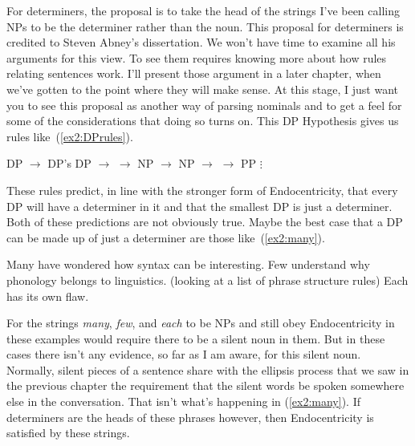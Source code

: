 For determiners, the proposal is to take the head of the strings I've been calling NPs to be the determiner rather than the noun. This proposal for determiners is credited to Steven Abney's dissertation.\cite{Abney:1987} We won't have time to examine all his arguments for this view. To see them requires knowing more about how rules relating sentences work. I'll present those argument in a later chapter, when we've gotten to the point where they will make sense. At this stage, I just want you to see this proposal as another way of parsing nominals and to get a feel for some of the considerations that doing so turns on. This DP Hypothesis gives us rules like~(\ref{ex2:DPrules}).
\enlargethispage*{20pt}
\begin{exe}
	\ex \label{ex2:DPrules}
	\begin{xlist}
		\ex DP $\rightarrow$ DP's 
		\ex DP $\rightarrow$ 
		\ex {} $\rightarrow$  NP
		\ex {} $\rightarrow$ 
		\ex NP $\rightarrow$ 
		\ex {} $\rightarrow$  PP
		\sn \hspace*{20pt}$\vdots$
	\end{xlist}
\end{exe}

These rules predict, in line with the stronger form of Endocentricity, that every DP will have a determiner in it and that the smallest DP is just a determiner. Both of these predictions are not obviously true. Maybe the best case that a DP can be made up of just a determiner are those like~(\ref{ex2:many}).
\enlargethispage*{\baselineskip}
\begin{exe}
	\ex \label{ex2:many} 
	\begin{xlist}
		\ex Many have wondered how syntax can be interesting.
		\ex Few understand why phonology belongs to linguistics.
		\ex (looking at a list of phrase structure rules) Each has its own flaw.
	\end{xlist}
\end{exe}
For the strings \emph{many}, \emph{few}, and \emph{each} to be NPs and still obey Endocentricity in these examples would require there to be a silent noun in them. But in these cases there isn't any evidence, so far as I am aware, for this silent noun. Normally, silent pieces of a sentence share with the ellipsis process that we saw in the previous chapter the requirement that the silent words be spoken somewhere else in the conversation. That isn't what's happening in (\ref{ex2:many}). If determiners are the heads of these phrases however, then Endocentricity is satisfied by these strings.

